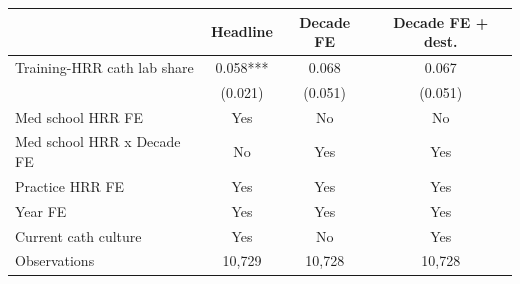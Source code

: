 
\begin{tabular}{lccc}
\toprule
 & Headline & Decade FE & Decade FE + dest.\\
\midrule
Training-HRR cath lab share & 0.058*** & 0.068 & 0.067\\
 & (0.021) & (0.051) & (0.051)\\
\midrule
Med school HRR FE & Yes & No & No\\
Med school HRR x Decade FE & No & Yes & Yes\\
Practice HRR FE & Yes & Yes & Yes\\
Year FE & Yes & Yes & Yes\\
Current cath culture & Yes & No & Yes\\
Observations & 10,729 & 10,728 & 10,728\\
\bottomrule
\end{tabular}
